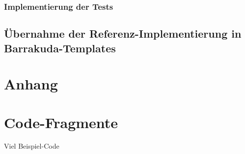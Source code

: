 \documentclass[12pt,a4paper,bibliography=totocnumbered,listof=totocnumbered]{scrartcl}
\begin{document}
\subsubsection{Implementierung der Tests}

\subsection{Übernahme der Referenz-Implementierung in Barrakuda-Templates}

\renewcommand\refname{Quellenverzeichnis}


\pagebreak

\setcounter{page}{1}

\begin{appendix}
\section*{Anhang}
{}

\section{Code-Fragmente}
Viel Beispiel-Code

\end{appendix}
\end{document}
